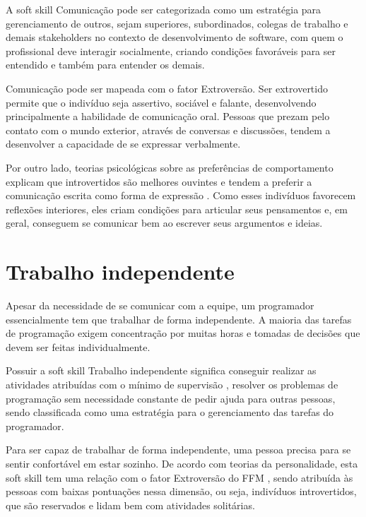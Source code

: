 A soft skill Comunicação pode ser categorizada como um estratégia para gerenciamento de outros, sejam superiores, subordinados, colegas de trabalho e demais stakeholders no contexto de desenvolvimento de software, com quem o profissional deve interagir socialmente, criando condições favoráveis para ser entendido e também para entender os demais.

Comunicação pode ser mapeada com o fator Extroversão. Ser extrovertido permite que o indivíduo seja assertivo, sociável e falante, desenvolvendo principalmente a habilidade de comunicação oral. Pessoas que prezam pelo contato com o mundo exterior, através de conversas e discussões, tendem a desenvolver a capacidade de se expressar verbalmente.

Por outro lado, teorias psicológicas sobre as preferências de comportamento explicam que introvertidos são melhores ouvintes e tendem a preferir a comunicação escrita como forma de expressão \cite{myers:98}. Como esses indivíduos favorecem reflexões interiores, eles criam condições para articular seus pensamentos e, em geral, conseguem se comunicar bem ao escrever seus argumentos e ideias.

\section{Trabalho independente}

Apesar da necessidade de se comunicar com a equipe, um programador essencialmente tem que trabalhar de forma independente. A maioria das tarefas de programação exigem concentração por muitas horas e tomadas de decisões que devem ser feitas individualmente.

Possuir a soft skill Trabalho independente significa conseguir realizar as atividades atribuídas com o mínimo de supervisão \cite{ahmed:12}, resolver os problemas de programação sem necessidade constante de pedir ajuda para outras pessoas, sendo classificada como uma estratégia para o gerenciamento das tarefas do programador.

Para ser capaz de trabalhar de forma independente, uma pessoa precisa para se sentir confortável em estar sozinho. De acordo com teorias da personalidade, esta soft skill tem uma relação com o fator Extroversão do FFM \cite{rehman:12}, sendo atribuída às pessoas com baixas pontuações nessa dimensão, ou seja, indivíduos introvertidos, que são reservados e lidam bem com atividades solitárias.

